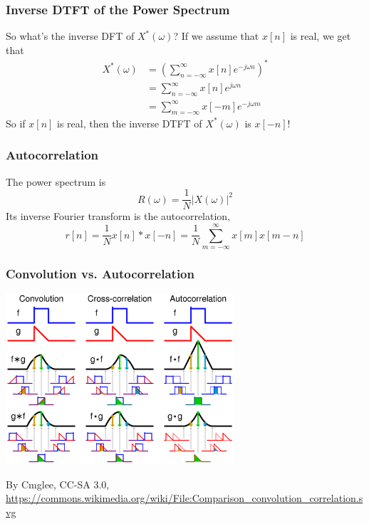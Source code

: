 \documentclass{beamer}
\begin{document}
\begin{frame}
  \frametitle{Inverse DTFT of the Power Spectrum}

  So what's the inverse DFT of $X^*(\omega)$?  If we assume that $x[n]$ is
  real, we get that
  \begin{align*}
    X^*(\omega) &= \left(\sum_{n=-\infty}^{\infty}x[n]e^{-j\omega n}\right)^*\\
    &= \sum_{n=-\infty}^{\infty}x[n]e^{j\omega n}\\
    &= \sum_{m=-\infty}^{\infty}x[-m]e^{-j\omega m}
  \end{align*}
  So if $x[n]$ is real, then the inverse DTFT of $X^*(\omega)$ is $x[-n]$!
\end{frame}
\begin{frame}
  \frametitle{Autocorrelation}
  The power spectrum is
  \[
  R(\omega)=\frac{1}{N}|X(\omega)|^2
  \]
  Its inverse Fourier transform is the autocorrelation,
  \[
  r[n] = \frac{1}{N}x[n]\ast x[-n]  = \frac{1}{N}\sum_{m=-\infty}^\infty  x[m] x[m-n]
  \]
\end{frame}

\begin{frame}
  \frametitle{Convolution vs. Autocorrelation}
  \centerline{\includegraphics[height=2.5in]{Comparison_convolution_correlation.png}}
  \begin{tiny}
    By Cmglee, CC-SA 3.0,
    \url{https://commons.wikimedia.org/wiki/File:Comparison_convolution_correlation.svg}
  \end{tiny}
\end{frame}
\end{document}
